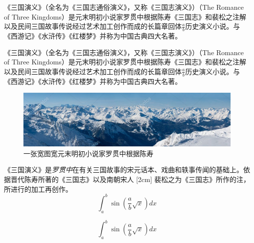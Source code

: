 《三国演义》（全名为《三国志通俗演义》，又称《三国志演义》）（The Romance of Three Kingdoms）是元末明初小说家罗贯中根据陈寿《三国志》和裴松之注解以及民间三国故事传说经过艺术加工创作而成的长篇章回体$\frac{a}{b}$历史演义小说。与《西游记》《水浒传》《红楼梦》并称为中国古典四大名著。

《三国演义》（全名为《三国志通俗演义》，又称《三国志演义》）（The Romance of Three Kingdoms）是元末明初小说家罗贯中根据陈寿《三国志》和裴松之注解以及民间三国故事传说经过艺术加工创作而成的长篇章回体$\frac{a}{b}$历史演义小说。与《西游记》《水浒传》《红楼梦》并称为中国古典四大名著。

\begin{figure}
    \includegraphics[width=\linewidth]{images/wide.jpeg}
    \caption{一张宽图宽元末明初小说家罗贯中根据陈寿}
\end{figure}

《三国演义》是\emph{罗贯中}在有关{\sffamily 三国故事的宋元话本}、戏曲和轶事传闻的基础上。依据晋代陈寿所著的《三国志》以及南朝宋人%
[2cm]%
裴松之为《三国志》所作的注，所进行的加工再创作。
\begin{equation}
    \int_a^b\sin(\frac{a}{b}\sqrt{x})dx
\end{equation}

\begin{equation}
    \int_a^b\sin(\frac{a}{b}\sqrt{x})dx
\end{equation}
